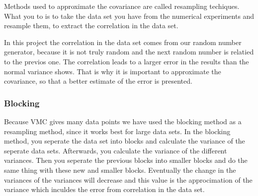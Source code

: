 Methods used to approximate the covariance are called resampling techiques. What you to is to take the data set you have from the numerical experiments and resample them, to extract the correlation in the data set. 

In this project the correlation in the data set comes from our random number generator, because it is not truly random and the next random number is relatied to the previos one. The correlation leads to a larger error in the results than the normal variance shows. That is why it is important to approximate the covariance, so that a better estimate of the error is presented.

\subsubsection{Blocking}

Because VMC gives many data points we have used the blocking method as a resampling method, since it works best for large data sets. In the blocking method, you seperate the data set into blocks and calculate the variance of the seperate data sets. Afterwards, you calculate the variance of the different variances. Then you seperate the previous blocks into smaller blocks and do the same thing with these new and smaller blocks. Eventually the change in the variances of the variances will decrease and this value is the approcimation of the variance which inculdes the error from correlation in the data set.

%
